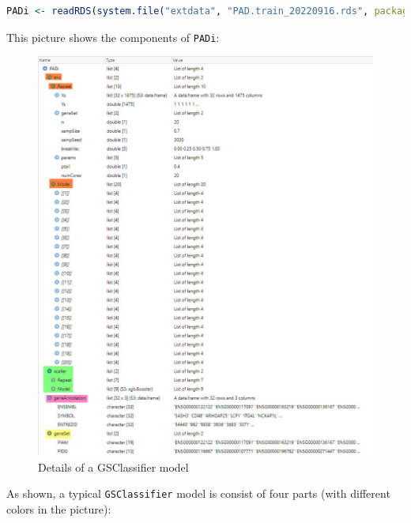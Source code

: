 \documentclass[
  12pt,
]{book}
\newcommand{\passthrough}[1]{#1}
\begin{document}
\begin{lstlisting}[language=R]
PADi <- readRDS(system.file("extdata", "PAD.train_20220916.rds", package = "GSClassifier")) 
\end{lstlisting}

This picture shows the components of \passthrough{\lstinline!PADi!}:

\begin{figure}

{\centering \includegraphics[width=0.9\linewidth]{./fig/GSClassifier-model} 

}

\caption{Details of a GSClassifier model}\label{fig:GSClassifierModel}
\end{figure}

As shown, a typical \passthrough{\lstinline!GSClassifier!} model is consist of four parts (with different colors in the picture):
\end{document}
